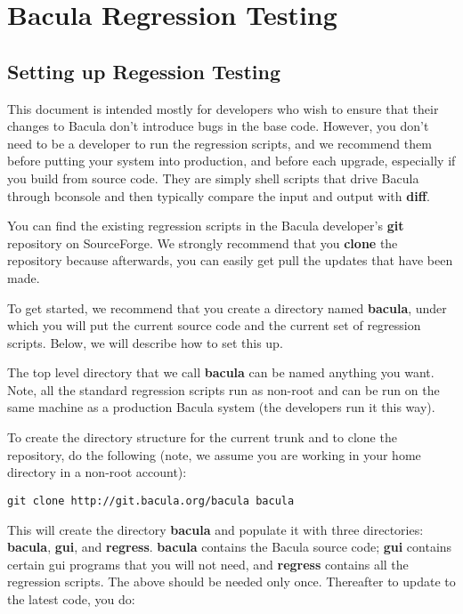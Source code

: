 
\chapter{Bacula Regression Testing}
\label{_ChapterStart8}

\section{Setting up Regession Testing}

This document is intended mostly for developers who wish to ensure that their
changes to Bacula don't introduce bugs in the base code.  However, you
don't need to be a developer to run the regression scripts, and we 
recommend them before putting your system into production, and before each
upgrade, especially if you build from source code.  They are
simply shell scripts that drive Bacula through bconsole and then typically
compare the input and output with {\bf diff}.

You can find the existing regression scripts in the Bacula developer's
{\bf git} repository on SourceForge.  We strongly recommend that you {\bf
clone} the repository because afterwards, you can easily get pull the
updates that have been made.

To get started, we recommend that you create a directory named {\bf
bacula}, under which you will put the current source code and the current
set of regression scripts.  Below, we will describe how to set this up.

The top level directory that we call {\bf bacula} can be named anything you
want.  Note, all the standard regression scripts run as non-root and can be
run on the same machine as a production Bacula system (the developers run
it this way).

To create the directory structure for the current trunk and to
clone the repository, do the following (note, we assume you
are working in your home directory in a non-root account):

\footnotesize
\begin{verbatim}
git clone http://git.bacula.org/bacula bacula
\end{verbatim}
\normalsize

This will create the directory {\bf bacula} and populate it with
three directories: {\bf bacula}, {\bf gui}, and {\bf regress}.
{\bf bacula} contains the Bacula source code; {\bf gui} contains
certain gui programs that you will not need, and {\bf regress} contains
all the regression scripts.  The above should be needed only
once. Thereafter to update to the latest code, you do:

